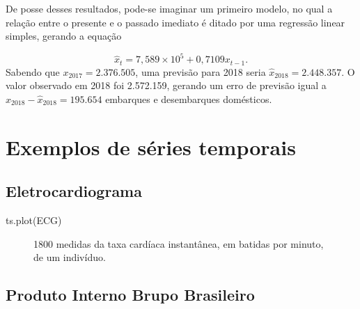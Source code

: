 \documentclass[
  letterpaper,
  DIV=11,
  numbers=noendperiod]{scrreprt}
\newenvironment{Shaded}{\begin{snugshade}}{\end{snugshade}}
\newcommand{\FunctionTok}[1]{\textcolor[rgb]{0.28,0.35,0.67}{#1}}
\newcommand{\NormalTok}[1]{\textcolor[rgb]{0.00,0.23,0.31}{#1}}
\theoremstyle{definition}
\theoremstyle{plain}
\theoremstyle{definition}
\theoremstyle{plain}
\theoremstyle{remark}
\begin{document}
De posse desses resultados, pode-se imaginar um primeiro modelo, no qual
a relação entre o presente e o passado imediato é ditado por uma
regressão linear simples, gerando a equação

\[\hat{x}_t = 7,589\times 10^5 +0,7109 x_{t-1}.\] Sabendo que
\(x_{2017}=2.376.505\), uma previsão para 2018 seria
\(\hat{x}_{2018}=2.448.357\). O valor observado em 2018 foi 2.572.159,
gerando um erro de previsão igual a \(x_{2018}-\hat{x}_{2018}=195.654\)
embarques e desembarques domésticos.

\hypertarget{exemplos-de-suxe9ries-temporais}{%
\section{Exemplos de séries
temporais}\label{exemplos-de-suxe9ries-temporais}}

\hypertarget{eletrocardiograma}{%
\subsection{Eletrocardiograma}\label{eletrocardiograma}}

\begin{Shaded}
\begin{Highlighting}[]
\FunctionTok{ts.plot}\NormalTok{(ECG)}
\end{Highlighting}
\end{Shaded}

\begin{figure}

\begin{minipage}[t]{\linewidth}

{\centering 


\caption{1800 medidas da taxa cardíaca instantânea, em batidas por
minuto, de um indivíduo.}

}

\end{minipage}%

\end{figure}

\hypertarget{produto-interno-brupo-brasileiro}{%
\subsection{Produto Interno Brupo
Brasileiro}\label{produto-interno-brupo-brasileiro}}
\end{document}
